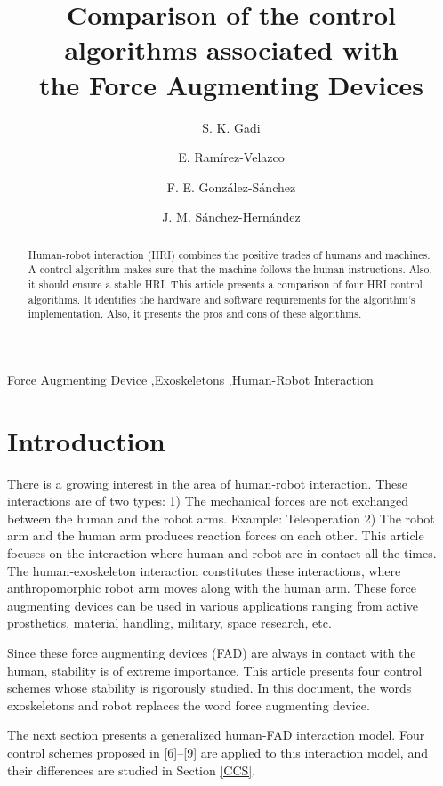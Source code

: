 \documentclass[preprint,12pt,3p]{elsarticle}
\begin{document}
\begin{frontmatter}
	
\title{Comparison of the control algorithms associated with\\the Force Augmenting Devices}
\author[FIME]{S. K. Gadi}
\address[FIME]{Facultad de Ingeniería Mecánica y Eléctrica, Universidad Autónoma de Coahuila, Torreón, Mexico.}
\author[ITA]{E. Ramírez-Velazco}
\address[ITA]{Departamento de Eléctrica-Electrónica, Instituto Tecnológico de Aguascalientes, Aguascalientes, Mexico.}
\author[FIME]{F. E. González-Sánchez}
\author[FIME]{J. M. Sánchez-Hernández}

\begin{abstract}
Human-robot interaction (HRI) combines the positive trades of humans and machines. A control algorithm makes sure that the machine follows the human instructions. Also, it should ensure a stable HRI. This article presents a comparison of four  HRI control algorithms. It identifies the hardware and software requirements for the algorithm's implementation. Also, it presents the pros and cons of these algorithms.
\end{abstract}

\begin{keyword}
Force Augmenting Device \sep Exoskeletons \sep Human-Robot Interaction
\end{keyword}
	
\end{frontmatter}
\section{Introduction}
\label{Introduction}
There is a growing interest in the area of human-robot interaction. These interactions are of two types: 1) The mechanical forces are not exchanged between the human and the robot arms. Example: Teleoperation 2) The robot arm and the human arm produces reaction forces on each other. This article focuses on the interaction where human and robot are in contact all the times. The human-exoskeleton interaction constitutes these interactions, where anthropomorphic robot arm moves along with the human arm. These force augmenting devices can be used in various applications ranging from active prosthetics, material handling, military, space research, etc.
\par
Since these force augmenting devices (FAD) are always in contact with the human, stability is of extreme importance. This article presents four control schemes whose stability is rigorously studied. In this document, the words exoskeletons and robot replaces the word force augmenting device.
\par
The next section presents a generalized human-FAD interaction model. Four control schemes proposed in [6]–[9] are applied to this interaction model, and their differences are studied in Section \ref{CCS}. 
\end{document}
